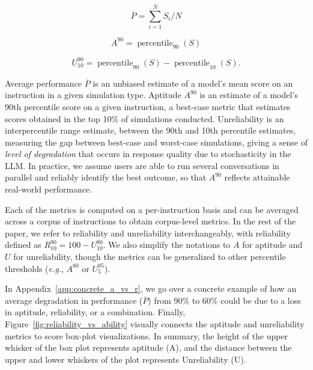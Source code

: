 \documentclass{article}
\begin{document}
\vspace{-1.0em}
\begin{center}
\begin{minipage}{0.2\textwidth}
\[
\overline{P} = \displaystyle\sum_{i=1}^N S_{i} \big/ N
\]
\end{minipage}
\hfill
\begin{minipage}{0.3\textwidth}
\[
A^{90} = \operatorname{percentile}_{90}(S)
\]
\end{minipage}
\hfill
\begin{minipage}{0.48\textwidth}
\[
U_{10}^{90} = \operatorname{percentile}_{90}(S) - \operatorname{percentile}_{10}(S).
\]
\end{minipage}
\end{center}
\vspace{-0.3em}

Average performance $\overline{P}$ is an unbiased estimate of a model's mean score on an instruction in a given simulation type. Aptitude $A^{90}$ is an estimate of a model's 90th percentile score on a given instruction, a best-case metric that estimates scores obtained in the top 10\% of simulations conducted. Unreliability is an interpercentile range estimate, between the 90th and 10th percentile estimates, measuring the gap between best-case and worst-case simulations, giving a sense of \textit{level of degradation} that occurs in response quality due to stochasticity in the LLM. In practice, we assume users are able to run several conversations in parallel and reliably identify the best outcome, so that $A^{90}$ reflects attainable real-world performance.

Each of the metrics is computed on a per-instruction basis and can be averaged across a corpus of instructions to obtain corpus-level metrics. In the rest of the paper, we refer to reliability and unreliability interchangeably, with reliability defined as $R_{10}^{90} = 100 - U_{10}^{90}$. We also simplify the notations to $A$ for aptitude and $U$ for unreliability, though the metrics can be generalized to other percentile thresholds (\textit{e.g.}, $A^{80}$ or $U_{5}^{95}$).

In Appendix~\ref{app:concrete_a_vs_r}, we go over a concrete example of how an average degradation in performance ($\overline{P}$) from 90\% to 60\% could be due to a loss in aptitude, reliability, or a combination. Finally, Figure~\ref{fig:reliability_vs_ability} visually connects the aptitude and unreliability metrics to score box-plot visualizations. In summary, the height of the upper whisker of the box plot represents aptitude (A), and the distance between the upper and lower whiskers of the plot represents Unreliability (U).
\end{document}
